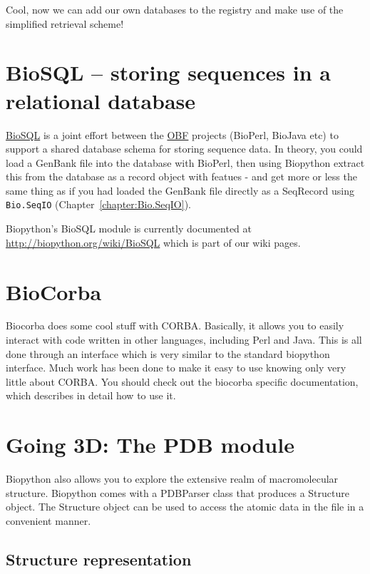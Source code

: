\documentclass{report}
\begin{document}
Cool, now we can add our own databases to the registry and make use of
the simplified retrieval scheme!

\section{BioSQL -- storing sequences in a relational database}

\href{http://www.biosql.org/}{BioSQL} is a joint effort between the
\href{http://open-bio.org/}{OBF} projects (BioPerl, BioJava etc) to support a
shared database schema for storing sequence data. In theory, you could load a
GenBank file into the database with BioPerl, then using Biopython extract this
from the database as a record object with featues - and get more or less the same
thing as if you had loaded the GenBank file directly as a SeqRecord using
\verb|Bio.SeqIO| (Chapter~\ref{chapter:Bio.SeqIO}).

Biopython's BioSQL module is currently documented at
\url{http://biopython.org/wiki/BioSQL} which is part of our wiki pages.

\section{BioCorba}

Biocorba does some cool stuff with CORBA. Basically, it allows you to easily interact with code written in other languages, including Perl and Java. This is all done through an interface which is very similar to the standard biopython interface. Much work has been done to make it easy to use knowing only very little about CORBA. You should check out the biocorba specific documentation, which describes in detail how to use it.

\section{Going 3D: The PDB module}

Biopython also allows you to explore the extensive realm of macromolecular structure.
Biopython comes with a PDBParser class that produces a Structure object. The Structure object
can be used to access the atomic data in the file in a convenient manner.

\subsection{Structure representation}
\end{document}
